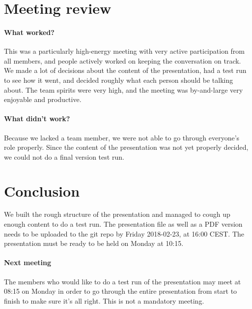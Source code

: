 \documentclass{article}
\begin{document}
\section{Meeting review}

\paragraph{What worked?}

This was a particularly high-energy meeting with very active participation from all members, and people actively worked on keeping the conversation on track. We made a lot of decisions about the content of the presentation, had a test run to see how it went, and decided roughly what each person should be talking about. The team spirits were very high, and the meeting was by-and-large very enjoyable and productive.

\paragraph{What didn't work?}

Because we lacked a team member, we were not able to go through everyone's role properly. Since the content of the presentation was not yet properly decided, we could not do a final version test run.

\section{Conclusion}

We built the rough structure of the presentation and managed to cough up enough content to do a test run. The presentation file as well as a PDF version needs to be uploaded to the git repo by Friday 2018-02-23, at 16:00 CEST. The presentation must be ready to be held on Monday at 10:15.

\paragraph{Next meeting}

The members who would like to do a test run of the presentation may meet at 08:15 on Monday in order to go through the entire presentation from start to finish to make sure it's all right. This is not a mandatory meeting.
\end{document}
